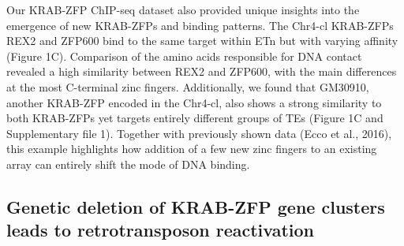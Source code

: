 \documentclass[11pt,a4paper]{article}
\begin{document}
Our KRAB-ZFP ChIP-seq dataset also provided unique insights into the emergence of new KRAB-ZFPs and binding patterns. The Chr4-cl KRAB-ZFPs REX2 and ZFP600 bind to the same target within ETn but with varying affinity (Figure 1C). Comparison of the amino acids responsible for DNA contact revealed a high similarity between REX2 and ZFP600, with the main differences at the most C-terminal zinc fingers. Additionally, we found that GM30910, another KRAB-ZFP encoded in the Chr4-cl, also shows a strong similarity to both KRAB-ZFPs yet targets entirely different groups of TEs (Figure 1C and Supplementary file 1). Together with previously shown data (Ecco et al., 2016), this example highlights how addition of a few new zinc fingers to an existing array can entirely shift the mode of DNA binding.

\subsection{Genetic deletion of KRAB-ZFP gene clusters leads to retrotransposon reactivation}
\end{document}
